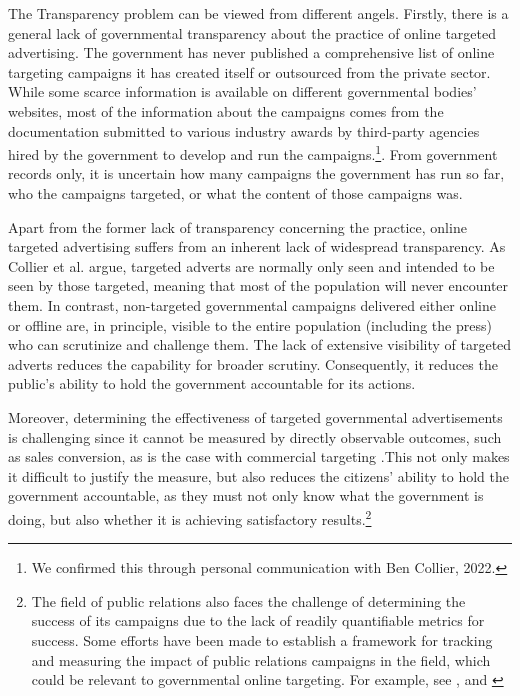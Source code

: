 \documentclass[preprint]{acmart}
\begin{document}
The Transparency problem can be viewed from different angels. Firstly, there is a general lack of governmental transparency about the practice of online targeted advertising. The government has never published a comprehensive list of online targeting campaigns it has created itself or outsourced from the private sector. While some scarce information is available on different governmental bodies' websites, most of the information about the campaigns comes from the documentation submitted to various industry awards by third-party agencies hired by the government to develop and run the campaigns.\footnote{We confirmed this through personal communication with Ben Collier, 2022.}. From government records only, it is uncertain how many campaigns the government has run so far, who the campaigns targeted, or what the content of those campaigns was.



Apart from the former lack of transparency concerning the practice, online targeted advertising suffers from an inherent lack of widespread transparency. As Collier et al. \cite{Collier2022} argue, targeted adverts are normally only seen and intended to be seen by those targeted, meaning that most of the population will never encounter them. In contrast, non-targeted governmental campaigns delivered either online or offline are, in principle, visible to the entire population (including the press) who can scrutinize and challenge them. The lack of extensive visibility of targeted adverts reduces the capability for broader scrutiny. Consequently, it reduces the public's ability to hold the government accountable for its actions. 


Moreover, determining the effectiveness of targeted governmental advertisements is challenging since it cannot be measured by directly observable outcomes, such as sales conversion, as is the case with commercial targeting \cite{Collier2022}.This not only makes it difficult to justify the measure, but also reduces the citizens' ability to hold the government accountable, as they must not only know what the government is doing, but also whether it is achieving satisfactory results.\footnote{The field of public relations also faces the challenge of determining the success of its campaigns due to the lack of readily quantifiable metrics for success. Some efforts have been made to establish a framework for tracking and measuring the impact of public relations campaigns in the field, which could be relevant to governmental online targeting. For example, see \cite{bakir2}, \cite{Michaelson} and \cite{plowman}} 
\end{document}
